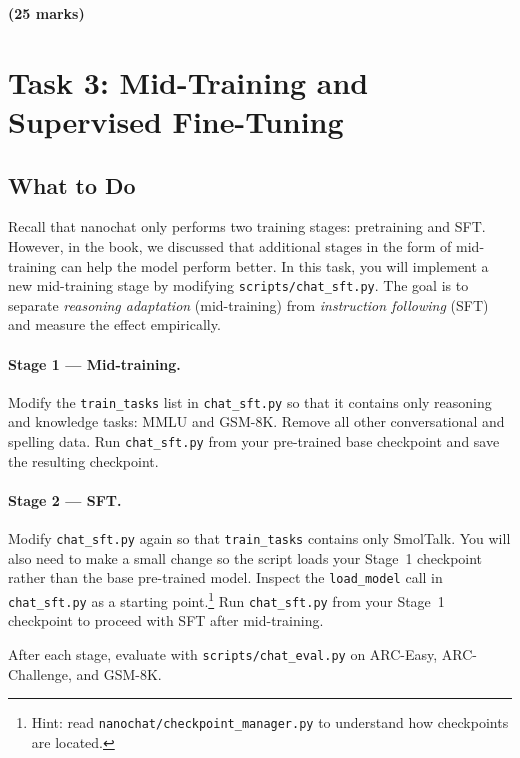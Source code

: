 \noindent\textbf{(25 marks)}

\section{Task 3: Mid-Training and Supervised Fine-Tuning}
\label{sec:task3}

\subsection{What to Do}

Recall that nanochat only performs two training stages: pretraining and SFT. However, in the book, we discussed that additional stages in the form of mid-training can help the model perform better. In this task, you will implement a new mid-training stage by modifying \texttt{scripts/chat\_sft.py}. The goal is to separate \emph{reasoning adaptation} (mid-training) from \emph{instruction following} (SFT) and measure the effect empirically.

\paragraph{Stage 1 --- Mid-training.}
Modify the \texttt{train\_tasks} list in \texttt{chat\_sft.py} so that it contains only reasoning and knowledge tasks: MMLU and GSM-8K. Remove all other conversational and spelling data. Run \texttt{chat\_sft.py} from your pre-trained base checkpoint and save the resulting checkpoint.

\paragraph{Stage 2 --- SFT.}
Modify \texttt{chat\_sft.py} again so that \texttt{train\_tasks} contains only SmolTalk. You will also need to make a small change so the script loads your Stage~1 checkpoint rather than the base pre-trained model. Inspect the \texttt{load\_model} call in \texttt{chat\_sft.py} as a starting point.\footnote{Hint: read \texttt{nanochat/checkpoint\_manager.py} to understand how checkpoints are located.} Run \texttt{chat\_sft.py} from your Stage~1 checkpoint to proceed with SFT after mid-training.

After each stage, evaluate with \texttt{scripts/chat\_eval.py} on ARC-Easy, ARC-Challenge, and GSM-8K.

